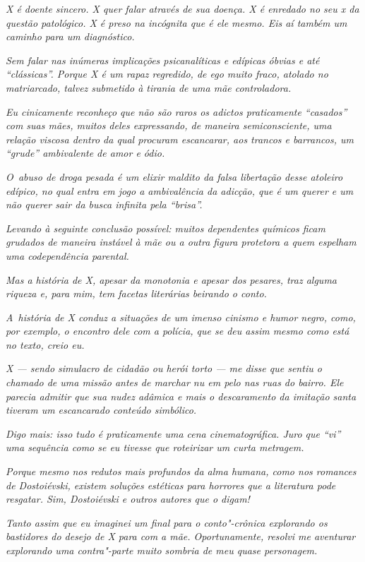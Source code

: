 \emph{X é doente sincero. X quer falar através de sua doença. X é
enredado no seu x da questão patológico. X é preso na incógnita que é
ele mesmo. Eis aí também um caminho para um diagnóstico.}

\emph{Sem falar nas inúmeras implicações psicanalíticas e edípicas
óbvias e até ``clássicas''. Porque X é um rapaz regredido, de ego muito
fraco, atolado no matriarcado, talvez submetido à tirania de uma mãe
controladora.}

\emph{Eu cinicamente reconheço que não são raros os adictos praticamente
``casados'' com suas mães, muitos deles expressando, de maneira semiconsciente, uma relação viscosa dentro da qual procuram escancarar, aos
trancos e barrancos, um ``grude'' ambivalente de amor e ódio.}

\emph{O~abuso de droga pesada é um elixir maldito da falsa libertação
desse atoleiro edípico, no qual entra em jogo a ambivalência da adicção,
que é um querer e um não querer sair da busca infinita pela ``brisa''.}

\emph{Levando à seguinte conclusão possível: muitos dependentes químicos
ficam grudados de maneira instável à mãe ou a outra figura protetora a
quem espelham uma codependência parental.}

\emph{Mas a história de X, apesar da monotonia e apesar dos pesares, traz
alguma riqueza e, para mim, tem facetas literárias beirando o conto.}

\emph{A~história de X conduz a situações de um imenso cinismo e humor
negro, como, por exemplo, o encontro dele com a polícia, que se deu
assim mesmo como está no texto, creio eu.}

\emph{X --- sendo simulacro de cidadão ou herói torto --- me disse que
sentiu o chamado de uma missão antes de marchar nu em pelo nas ruas do
bairro. Ele parecia admitir que sua nudez adâmica e mais o descaramento
da imitação santa tiveram um escancarado conteúdo simbólico.}

\emph{Digo mais: isso tudo é praticamente uma cena cinematográfica. Juro
que ``vi'' uma sequência como se eu tivesse que roteirizar um curta
metragem.}

\emph{Porque mesmo nos redutos mais profundos da alma humana, como nos
romances de Dostoiévski, existem soluções estéticas para horrores que a
literatura pode resgatar. Sim, Dostoiévski e outros autores que o
digam!}

\emph{Tanto assim que eu imaginei um final para o conto"-crônica
explorando os bastidores do desejo de X para com a mãe. Oportunamente,
resolvi me aventurar explorando uma contra"-parte muito sombria de meu
quase personagem.}

